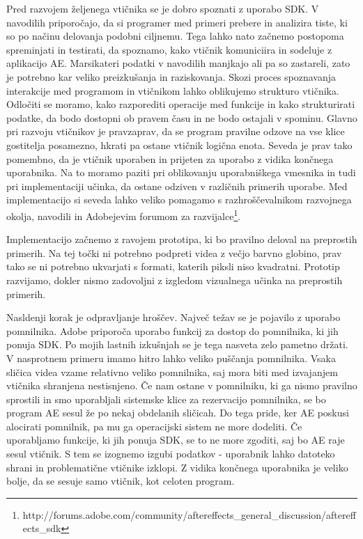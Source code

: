 \documentclass[a4paper, 12pt]{book}
\begin{document}
Pred razvojem željenega vtičnika se je dobro spoznati z uporabo SDK. 
V navodilih priporočajo, da si programer med primeri prebere in analizira tiste, ki so po načinu delovanja podobni ciljnemu\cite{aesdk}. 
Tega lahko nato začnemo postopoma spreminjati in testirati, da spoznamo, kako vtičnik komuniciira in sodeluje z aplikacijo AE.
Marsikateri podatki v navodilih manjkajo ali pa so zastareli, zato je potrebno kar veliko preizkušanja in raziskovanja.  
Skozi proces spoznavanja interakcije med programom in vtičnikom lahko oblikujemo strukturo vtičnika. 
Odločiti se moramo, kako razporediti operacije med funkcije in kako  strukturirati podatke, da bodo dostopni ob pravem času in ne bodo ostajali v spominu. 
Glavno pri razvoju vtičnikov je pravzaprav, da se program pravilne odzove na vse klice gostitelja posamezno, hkrati pa ostane vtičnik logična enota.
Seveda je prav tako pomembno, da je vtičnik uporaben in prijeten za uporabo z vidika končnega uporabnika.
Na to moramo paziti pri oblikovanju uporabniškega vmesnika in tudi pri implementaciji učinka, da ostane odziven v različnih primerih uporabe.
Med implementacijo si seveda lahko veliko pomagamo s razhroščevalnikom razvojnega okolja, navodili in Adobejevim forumom za razvijalce\footnote{http://forums.adobe.com/community/aftereffects\_general\_discussion/aftereffects\_sdk}.

Implementacijo začnemo z ravojem prototipa, ki bo pravilno deloval na preprostih primerih.
Na tej točki ni potrebno podpreti videa z večjo barvno globino, prav tako se ni potrebno ukvarjati s formati, katerih piksli niso kvadratni.
Prototip razvijamo, dokler nismo zadovoljni z izgledom vizualnega učinka na preprostih primerih.

Nasldenji korak je odpravljanje hroščev.
Največ težav se je pojavilo z uporabo pomnilnika.
Adobe priporoča uporabo funkcij za dostop do pomnilnika, ki jih ponuja SDK.
Po mojih lastnih izkušnjah se je tega nasveta zelo pametno držati.
V nasprotnem primeru imamo hitro lahko veliko puščanja pomnilnika.
Vsaka sličica videa vzame relativno veliko pomnilnika, saj mora biti med izvajanjem vtičnika shranjena nestisnjeno.
Če nam ostane v pomnilniku, ki ga nismo pravilno sprostili in smo uporabljali sistemske klice za rezervacijo pomnilnika, se bo program AE sesul že po nekaj obdelanih sličicah.
Do tega pride, ker AE poskusi alocirati pomnilnik, pa mu ga operacijski sistem ne more dodeliti. 
Če uporabljamo funkcije, ki jih ponuja SDK, se to ne more zgoditi, saj bo AE raje sesul vtičnik.
S tem se izognemo izgubi podatkov - uporabnik lahko datoteko shrani in problematične vtičnike izklopi.
Z vidika končnega uporabnika je veliko bolje, da se sesuje samo vtičnik, kot celoten program.
\end{document}
